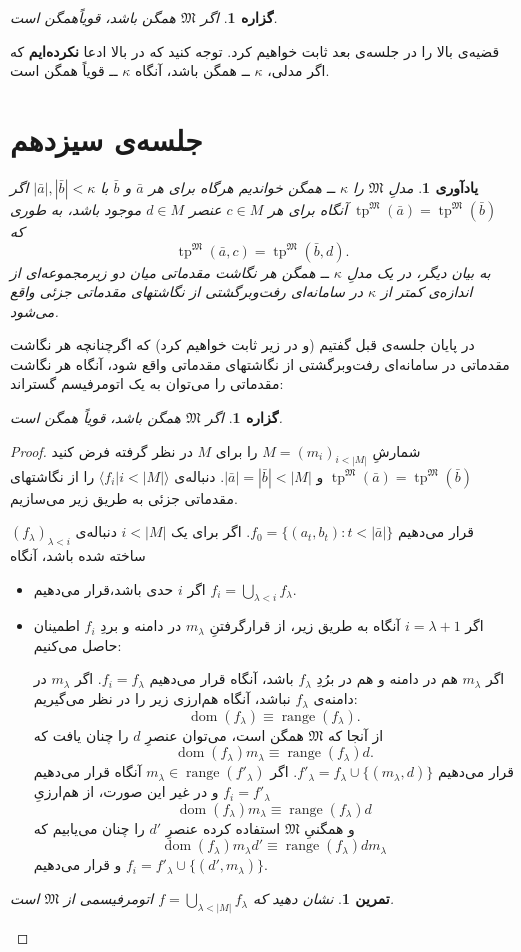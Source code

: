 \documentclass[12pt,a4paper]{report}
\theoremstyle{colorhead}
\newtheorem{tam}{تمرین}
\newtheorem{prop}[thm]{گزاره}
\newtheorem{yad}[thm]{یادآوری}
\DeclareMathOperator{\dom}{dom}
\DeclareMathOperator{\range}{range}
\DeclareMathOperator{\tp}{tp}
\begin{document}
\begin{prop}
اگر
$\mathfrak{M}$
همگن باشد، قویاًهمگن است.
\end{prop}
قضیه‌ی بالا را در جلسه‌ی بعد ثابت خواهیم کرد. توجه کنید که در بالا ادعا\textbf{ نکرده‌ایم} که اگر
مدلی،
$\kappa$ ــ
همگن باشد، آنگاه
$\kappa$ 
ــ 
قویاً همگن است. 
\newpage
\section{جلسه‌ی سیزدهم}
\begin{yad}
مدلِ
$\mathfrak{M}$
را
$\kappa$
ــ
همگن خواندیم هرگاه برای هر
$\bar{a}$
و
$\bar{b}$
با
$|\bar{a}|, |\bar{b}|<\kappa$
اگر
\mbox{$\tp^\mathfrak{M}(\bar{a})=\tp^\mathfrak{M}(\bar{b})$}
آنگاه برای هر
$c\in M$
عنصر
$d\in M$
موجود باشد، به طوری که
\[\tp^\mathfrak{M}(\bar{a},c)=\tp^\mathfrak{M}(\bar{b},d).\]
به بیان دیگر، در یک مدلِ
$\kappa$
ــ
همگن هر نگاشت مقدماتی میان دو زیرمجموعه‌ای از اندازه‌ی کمتر از
$\kappa$
در سامانه‌ای رفت‌وبرگشتی  از نگاشتهای مقدماتی جزئی واقع می‌شود.
\end{yad}
در پایان جلسه‌ی قبل گفتیم (و در زیر ثابت خواهیم کرد)‌ که اگرچنانچه هر نگاشت مقدماتی
در سامانه‌ای رفت‌وبرگشتی از نگاشتهای مقدماتی واقع شود، آنگاه هر نگاشت مقدماتی را می‌توان به یک اتومرفیسم گستراند:
\begin{prop}
اگر
$\mathfrak{M}$
همگن باشد، قویاً همگن است.
\end{prop}
\begin{proof}
شمارشِ
$M=(m_i)_{i< |M|}$
را برای 
$M$
در نظر گرفته فرض کنید
$\tp^\mathfrak{M}(\bar{a})=\tp^\mathfrak{M}(\bar{b})$
و
$|\bar{a}|=|\bar{b}|<|M|$.
دنباله‌ی
$\langle f_i|i<|M|\rangle$
را
از نگاشتهای مقدماتی جزئی  به طریق زیر می‌سازیم. 
\par 
قرار می‌دهیم
$f_0=\{(a_t,b_t):{t<|\bar{a}|}\}$.
اگر
برای یک
$i<|M|$
دنباله‌ی
$(f_\lambda)_{\lambda<i}$
ساخته شده باشد، آنگاه
\begin{itemize}
\item 
 اگر
 $i$
 حدی باشد،‌قرار می‌دهیم
 $f_i=\bigcup_{\lambda<i} f_\lambda$.
 \item 
 اگر
 $i=\lambda+1$
 آنگاه
 به طریق زیر، از قرارگرفتنِ
 $m_\lambda$
  در دامنه و 
 بردِ
 $f_i$
 اطمینان حاصل می‌کنیم:
 \par 
اگر
 $m_\lambda$
 هم در دامنه و هم در برُدِ
 $f_\lambda$
 باشد،
 آنگاه قرار می‌دهیم 
 $f_{i}=f_\lambda$.
 اگر
 $m_\lambda$
 در دامنه‌ی
 $f_\lambda$
 نباشد، آنگاه هم‌ارزی زیر را در نظر می‌گیریم:
 \[
 \dom(f_\lambda)\equiv \range (f_\lambda).
 \]
 از آنجا که
 $\mathfrak{M}$
 همگن است، می‌توان عنصرِ
 $d$
 را چنان یافت که
 \[
 \dom(f_\lambda)m_\lambda\equiv \range (f_\lambda)d.
 \]
 قرار می‌دهیم
 $f'_\lambda=f_\lambda\cup \{(m_\lambda,d)\}$.
 اگر
 $m_\lambda\in \range (f'_\lambda)$
 آنگاه قرار می‌دهیم
 $f_{i}=f'_\lambda$
 و در غیر این صورت، از هم‌ارزیِ
 \[
 \dom(f_\lambda)m_\lambda\equiv \range (f_\lambda) d
 \]
 و همگنیِ
 $\mathfrak{M}$
 استفاده کرده عنصرِ
 $d'$
 را چنان می‌یابیم که 
 \[
  \dom(f_\lambda)m_\lambda d'\equiv \range (f_\lambda) dm_\lambda
 \]
 و قرار می‌دهیم
 $f_i=f'_\lambda\cup \{(d',m_\lambda)\}$.
\end{itemize}
\begin{tam}
نشان دهید که 
$f=\bigcup_{\lambda<|M|} f_\lambda$
اتومرفیسمی از 
$\mathfrak{M}$
است.
\end{tam}
\end{proof}
\end{document}
